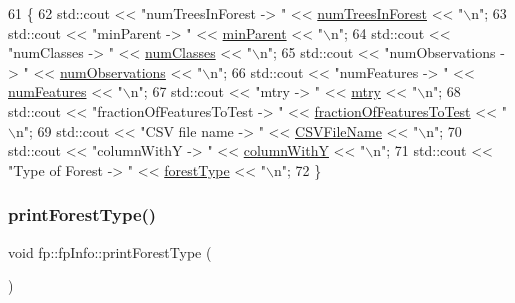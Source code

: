\begin{DoxyCode}
61                                    \{
62         std::cout << \textcolor{stringliteral}{"numTreesInForest -> "} << \hyperlink{classfp_1_1fpInfo_a8dbd62dca5c972c29d29a69d90ca2632}{numTreesInForest} << \textcolor{stringliteral}{"\(\backslash\)n"};
63         std::cout << \textcolor{stringliteral}{"minParent -> "} << \hyperlink{classfp_1_1fpInfo_a128fab7ba6da0fc76da00b48bb1bd7d5}{minParent} << \textcolor{stringliteral}{"\(\backslash\)n"};
64         std::cout << \textcolor{stringliteral}{"numClasses -> "} << \hyperlink{classfp_1_1fpInfo_a1c98a9ced12230f21003f78d742625a3}{numClasses} << \textcolor{stringliteral}{"\(\backslash\)n"};
65         std::cout << \textcolor{stringliteral}{"numObservations -> "} << \hyperlink{classfp_1_1fpInfo_a1b35cd17d4ddb35e232246a6549d7a74}{numObservations} << \textcolor{stringliteral}{"\(\backslash\)n"};
66         std::cout << \textcolor{stringliteral}{"numFeatures -> "} << \hyperlink{classfp_1_1fpInfo_a6ed8deabebae772fc213730cd29a2e61}{numFeatures} << \textcolor{stringliteral}{"\(\backslash\)n"};
67         std::cout << \textcolor{stringliteral}{"mtry -> "} << \hyperlink{classfp_1_1fpInfo_a62cccc1eb5641ebec2a6cc86cf03eedf}{mtry} << \textcolor{stringliteral}{"\(\backslash\)n"};
68         std::cout << \textcolor{stringliteral}{"fractionOfFeaturesToTest -> "} << \hyperlink{classfp_1_1fpInfo_ab949cb97523283367e9b120fd78e3c3b}{fractionOfFeaturesToTest} << \textcolor{stringliteral}{
      "\(\backslash\)n"};
69         std::cout << \textcolor{stringliteral}{"CSV file name -> "} <<  \hyperlink{classfp_1_1fpInfo_aac01e5ddb27bc333e172a0422066af1c}{CSVFileName} << \textcolor{stringliteral}{"\(\backslash\)n"};
70         std::cout << \textcolor{stringliteral}{"columnWithY -> "} << \hyperlink{classfp_1_1fpInfo_ac29e135cd84cdef547b678e7ea37f92d}{columnWithY} << \textcolor{stringliteral}{"\(\backslash\)n"};
71         std::cout << \textcolor{stringliteral}{"Type of Forest -> "} << \hyperlink{classfp_1_1fpInfo_a3001fbf80d86022e53578d6adf133b90}{forestType} << \textcolor{stringliteral}{"\(\backslash\)n"};
72     \}
\end{DoxyCode}
\mbox{\label{classfp_1_1fpInfo_a1acfffe3b13e5cad548f92cd09ff7f46}} 
\subsubsection{\texorpdfstring{print\+Forest\+Type()}{printForestType()}}
{\footnotesize\ttfamily void fp\+::fp\+Info\+::print\+Forest\+Type (\begin{DoxyParamCaption}{ }\end{DoxyParamCaption})}



